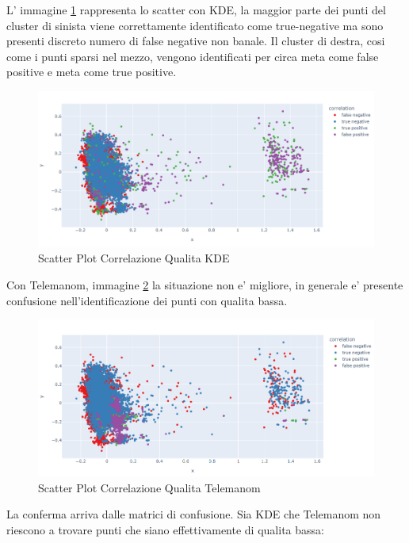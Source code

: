 L' immagine \ref{kde_quality} rappresenta lo scatter con KDE, la maggior parte dei punti del cluster di sinista viene correttamente identificato come true-negative ma sono presenti discreto numero di false negative non banale. Il cluster di destra, cosi come i punti sparsi nel mezzo, vengono identificati per circa meta come false positive e meta come true positive.
\begin{figure}[t]
\centering
	\includegraphics[width=14cm, scale=1]{images/correlation_ssb1_quality_plot.png}
 \caption{Scatter Plot Correlazione Qualita KDE}
	\label{kde_quality}
\end{figure}

Con Telemanom, immagine \ref{worst_clf_quality} la situazione non e' migliore, in generale e' presente confusione nell'identificazione dei punti con qualita bassa.


\begin{figure}[t]
	\centering
	\includegraphics[width=14cm, scale=1]{images/worst_correlation_ssb1_quality_plot}
 \caption{Scatter Plot Correlazione Qualita Telemanom}
	\label{worst_clf_quality}
\end{figure}

La conferma arriva dalle matrici di confusione. Sia KDE che Telemanom non riescono a trovare punti che siano effettivamente di qualita bassa:



